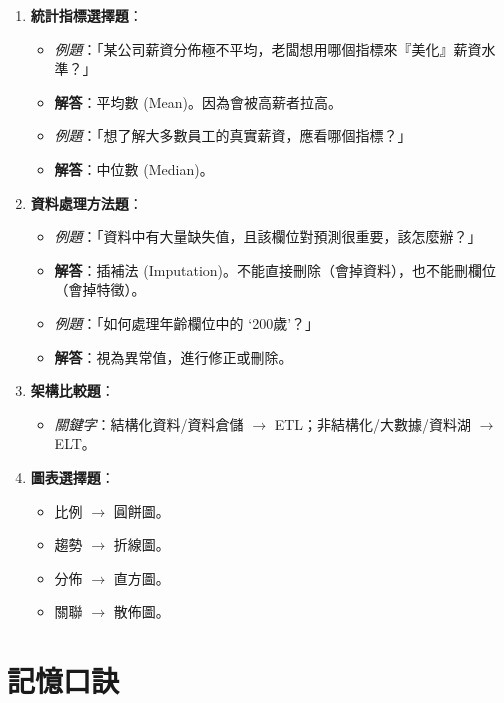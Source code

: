 \documentclass[
  letterpaper,
  DIV=11,
  numbers=noendperiod]{scrreprt}
\providecommand{\tightlist}{%
  \setlength{\itemsep}{0pt}\setlength{\parskip}{0pt}}
\begin{document}
\begin{enumerate}
\def\labelenumi{\arabic{enumi}.}
\tightlist
\item
  \textbf{統計指標選擇題}：

  \begin{itemize}
  \tightlist
  \item
    \emph{例題}：「某公司薪資分佈極不平均，老闆想用哪個指標來『美化』薪資水準？」
  \item
    \textbf{解答}：平均數 (Mean)。因為會被高薪者拉高。
  \item
    \emph{例題}：「想了解大多數員工的真實薪資，應看哪個指標？」
  \item
    \textbf{解答}：中位數 (Median)。
  \end{itemize}
\item
  \textbf{資料處理方法題}：

  \begin{itemize}
  \tightlist
  \item
    \emph{例題}：「資料中有大量缺失值，且該欄位對預測很重要，該怎麼辦？」
  \item
    \textbf{解答}：插補法
    (Imputation)。不能直接刪除（會掉資料），也不能刪欄位（會掉特徵）。
  \item
    \emph{例題}：「如何處理年齡欄位中的 `200歲'？」
  \item
    \textbf{解答}：視為異常值，進行修正或刪除。
  \end{itemize}
\item
  \textbf{架構比較題}：

  \begin{itemize}
  \tightlist
  \item
    \emph{關鍵字}：結構化資料/資料倉儲 \(\rightarrow\)
    ETL；非結構化/大數據/資料湖 \(\rightarrow\) ELT。
  \end{itemize}
\item
  \textbf{圖表選擇題}：

  \begin{itemize}
  \tightlist
  \item
    比例 \(\rightarrow\) 圓餅圖。
  \item
    趨勢 \(\rightarrow\) 折線圖。
  \item
    分佈 \(\rightarrow\) 直方圖。
  \item
    關聯 \(\rightarrow\) 散佈圖。
  \end{itemize}
\end{enumerate}

\section{記憶口訣}\label{ux8a18ux61b6ux53e3ux8a23-2}
\end{document}

